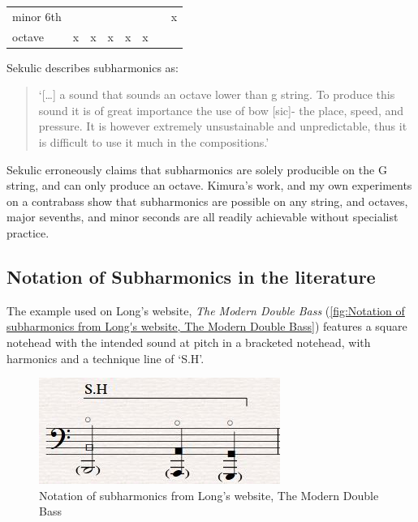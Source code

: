 \begin{table}
\begin{tabular}{llllllll}
  minor 6th            &                         &                       &                       &                       &                       &                       & x                      \\
  octave               & x                       & x                     & x                     & x                     & x                     &                       &                        \\
  \bottomrule
  \end{tabular}
  \end{table}

Sekulic describes subharmonics as:

\begin{quotation}
  `[\ldots] a sound that sounds an octave lower than g string. To produce this sound it is of great importance the use of bow [sic]- the place, speed, and pressure. It is however extremely unsustainable and unpredictable, thus it is difficult to use it much in the compositions.'\autocite[15]{sekulicYouHearMe2012}
\end{quotation}

Sekulic erroneously claims that subharmonics are solely producible on the G string, and can only produce an octave. 
Kimura's work, and my own experiments on a contrabass show that subharmonics are possible on any string, and octaves, major sevenths, and minor seconds are all readily achievable without specialist practice.\autocite[]{kimuraHowProduceSubharmonics1999}



\subsection{Notation of Subharmonics in the literature}

The example used on Long's website, \emph{The Modern Double Bass} (\autoref{fig:Notation of subharmonics from Long's website, The Modern Double Bass}) features a square notehead with the intended sound at pitch in a bracketed notehead, with harmonics and a technique line of `S.H'.\autocite[]{longSubharmonics2019}

\begin{figure}
  \includegraphics[width=\linewidth]{./resources/longSubharmonicNotation.jpg}
  \caption{Notation of subharmonics from Long's website, The Modern Double Bass}
\label{fig:Notation of subharmonics from Long's website, The Modern Double Bass}
\end{figure}


